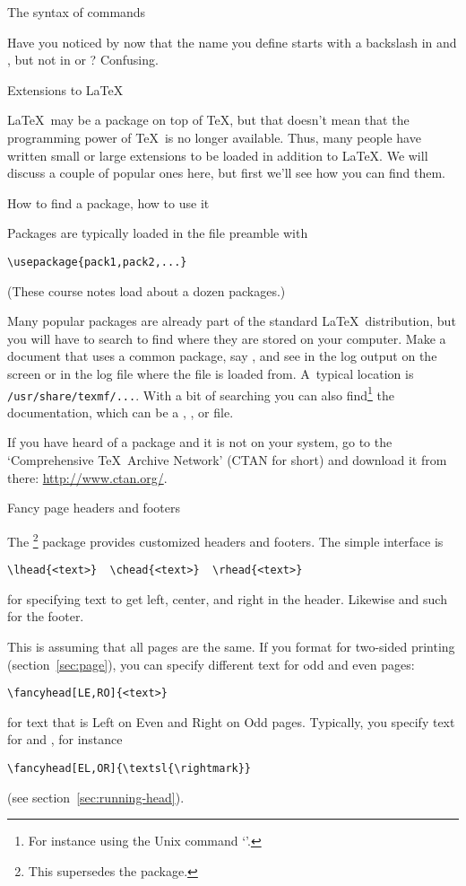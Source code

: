  {The syntax of  commands}

Have you noticed by now that the name you define starts with a
backslash in  and , but not in
 or ? Confusing.

 {Extensions to \LaTeX}

\LaTeX\ may be a package on top of \TeX, but that doesn't mean that the
programming power of \TeX\ is no longer available. Thus, many people
have written small or large extensions to be loaded in addition to
\LaTeX. We will discuss a couple of popular ones here, but first we'll
see how you can find them.

 {How to find a package, how to use it}
\label{sec:ctan}

Packages are typically loaded in the file preamble with
\begin{verbatim}
\usepackage{pack1,pack2,...}
\end{verbatim}
(These course notes load about a dozen packages.)

Many popular packages are already part of the standard
\LaTeX\ distribution, but you will have to search to find where they
are stored on your computer. Make a document that uses a common
package, say , and see in the log output on the screen or
in the log file where the file is loaded from. A~typical location is
\verb+/usr/share/texmf/...+. With a bit of searching you can also
find\footnote{For instance using the Unix command `'.} the
documentation, which can be a , , or  file.

If you have heard of a package and it is not on your system, go to the
`Comprehensive \TeX\ Archive Network' (CTAN for short) and
download it from there: \url{http://www.ctan.org/}.

 {Fancy page headers and footers}
\label{sec:fancy-head}

The \footnote{This supersedes the 
package.} package provides customized headers and footers. The simple
interface is 
\begin{verbatim}
\lhead{<text>}  \chead{<text>}  \rhead{<text>}
\end{verbatim}
for specifying text to get left, center, and right in the
header. Likewise  and such for the footer.

This is assuming that all pages are the same. If you format for
two-sided printing (section~\ref{sec:page}), you can specify different
text for odd and even pages:
\begin{verbatim}
\fancyhead[LE,RO]{<text>}
\end{verbatim}
for text that is Left on Even and Right on Odd pages. Typically, you
specify text for \n{[LE,RO]} and \n{[RE,LO]}, for instance
\begin{verbatim}
\fancyhead[EL,OR]{\textsl{\rightmark}}
\end{verbatim}
(see section~\ref{sec:running-head}).


